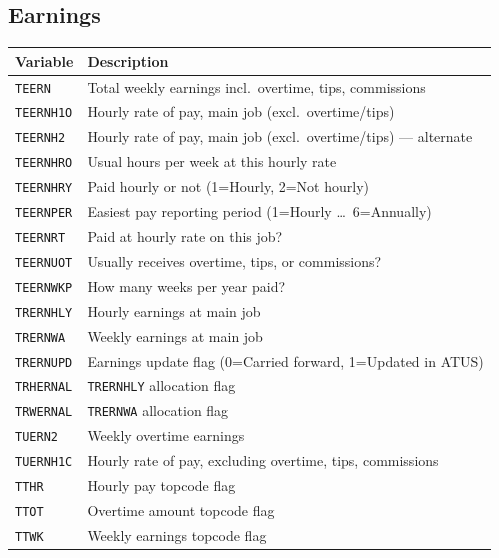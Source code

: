 \documentclass[11pt, a4paper]{article}
\begin{document}
\subsection{Earnings}
\begin{longtable}{L{3.5cm} L{12cm}}
\toprule \textbf{Variable} & \textbf{Description} \\ \midrule \endhead
\bottomrule \endfoot
\texttt{TEERN}    & Total weekly earnings incl.\ overtime, tips, commissions \\
 \texttt{TEERNH1O} & Hourly rate of pay, main job (excl.\ overtime/tips) \\
\texttt{TEERNH2}  & Hourly rate of pay, main job (excl.\ overtime/tips) --- alternate \\
 \texttt{TEERNHRO} & Usual hours per week at this hourly rate \\
\texttt{TEERNHRY} & Paid hourly or not (1=Hourly, 2=Not hourly) \\
 \texttt{TEERNPER} & Easiest pay reporting period (1=Hourly \ldots\ 6=Annually) \\
\texttt{TEERNRT}  & Paid at hourly rate on this job? \\
 \texttt{TEERNUOT} & Usually receives overtime, tips, or commissions? \\
\texttt{TEERNWKP} & How many weeks per year paid? \\
 \texttt{TRERNHLY} & Hourly earnings at main job \\
\texttt{TRERNWA}  & Weekly earnings at main job \\
 \texttt{TRERNUPD} & Earnings update flag (0=Carried forward, 1=Updated in ATUS) \\
\texttt{TRHERNAL} & \texttt{TRERNHLY} allocation flag \\
 \texttt{TRWERNAL} & \texttt{TRERNWA} allocation flag \\
\texttt{TUERN2}   & Weekly overtime earnings \\
 \texttt{TUERNH1C} & Hourly rate of pay, excluding overtime, tips, commissions \\
\texttt{TTHR}     & Hourly pay topcode flag \\
 \texttt{TTOT}     & Overtime amount topcode flag \\
\texttt{TTWK}     & Weekly earnings topcode flag \\
\end{longtable}
\end{document}
